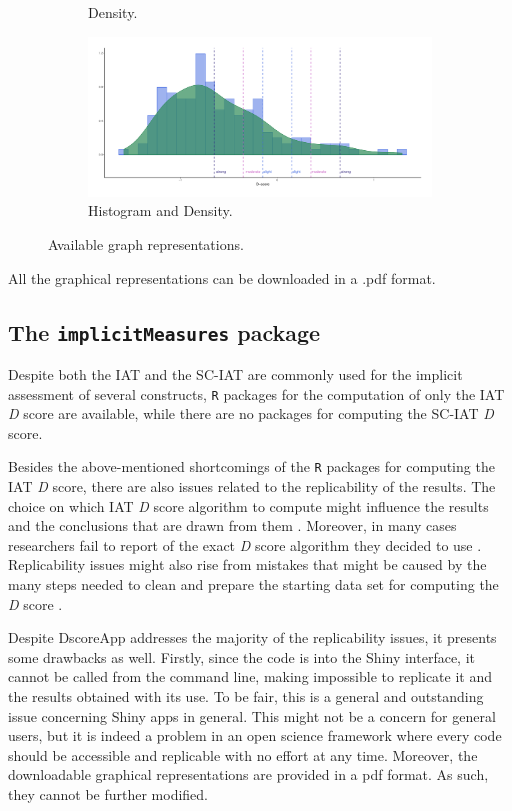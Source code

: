 \documentclass[12pt]{book}
\begin{document}
\begin{figure}[h!]
\begin{subfigure}{0.45\linewidth}
		\caption{Density.}
		\label{fig:dens}
	\end{subfigure}
	\begin{subfigure}{0.45\linewidth}
		\includegraphics[width=\linewidth]{HistDensDscore3.pdf}
		\caption{Histogram and Density.}
		\label{fig:histdens}
	\end{subfigure}
	\caption{\label{fig:dscoregraph} Available graph representations.}
\end{figure}
All the graphical representations can be downloaded in a .pdf format.

\subsection{The \texttt{implicitMeasures} package}\label{sub:package}

Despite both the IAT and the SC-IAT are commonly used for the implicit assessment of several constructs, \texttt{R} packages for the computation of only the IAT \emph{D} score are available, while there are no packages for computing the SC-IAT \emph{D} score.

Besides the above-mentioned shortcomings of the \verb*|R| packages for computing the IAT \emph{D} score, there are also issues related to the replicability of the results.
The choice on which IAT \emph{D} score algorithm to compute might influence the results and the conclusions that are drawn from them \cite{ellithorpe2015}. Moreover, in many cases researchers fail to report of the exact \emph{D} score algorithm they decided to use \cite{ellithorpe2015}. 
Replicability issues might also rise from mistakes that might be caused by the many steps needed to clean and prepare the starting data set for computing the \emph{D} score \cite{ellithorpe2015}. 

Despite DscoreApp addresses the majority of the replicability issues, it presents some drawbacks as well. Firstly, since the code is into the Shiny interface, it cannot be called from the command line, making  impossible to replicate it and the results obtained with its use. 
To be fair, this is a general and outstanding issue concerning Shiny apps in general. 
This might not be a concern for general users, but it is indeed a problem in an open science framework where every code should be accessible and replicable with no effort at any time.
Moreover, the downloadable graphical representations are provided in a pdf format. As such, they cannot be further modified.
\end{document}
